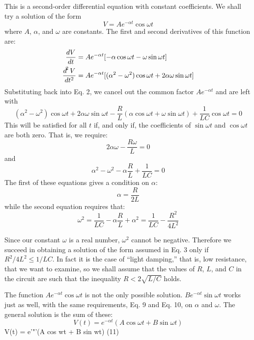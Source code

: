 This is a second-order differential equation with constant 
coefficients. We shall try a solution of the form
\begin{equation}
  V = A e^{-\alpha t}\cos\omega t
\end{equation}
where $A$, $\alpha$, and $\omega$ are constants. The first and second derivatives of
this function are:
\begin{align}
  \frac{\mathop{d\!} V}{\mathop{d\!} t} &=    A e^{-\alpha t}[-\alpha\cos\omega t-\omega\sin\omega t] \\
  \frac{\mathop{d\!}^2V}{\mathop{d\!} t^2} &= A e^{-\alpha t}[(\alpha^2-\omega^2)\cos\omega t+2\alpha\omega\sin\omega t]
\end{align}
Substituting back into Eq. 2, we cancel out the common factor $A e^{-\alpha t}$
and are left with
\begin{equation}
  (\alpha^2-\omega^2)\cos\omega t+2\alpha\omega\sin\omega t
       -\frac{R}{L}(\alpha\cos\omega t+\omega\sin\omega t)
       +\frac{1}{LC}\cos\omega t = 0
\end{equation}
This will be satisfied for all $t$ if, and only if, the coefficients of $\sin \omega t$
and $\cos\omega t$ are both zero. That is, we require:
\begin{equation}
  2\alpha\omega-\frac{R\omega}{L} = 0
\end{equation}
and
\begin{equation}
  \alpha^2-\omega^2-\alpha\frac{R}{L}+\frac{1}{LC} = 0
\end{equation}
The first of these equations gives a condition on $\alpha$:
\begin{equation}
  \alpha = \frac{R}{2L}
\end{equation}
while the second equation requires that:
\begin{equation}
  \omega^2 = \frac{1}{LC}-\alpha \frac{R}{L} + \alpha^2 = \frac{1}{LC}-\frac{R^2}{4L^2}
\end{equation}

Since our constant $\omega$ is a real number, $\omega^2$ cannot be negative.
Therefore we succeed in obtaining a solution of the form assumed in
Eq. 3 only if $R^2/4L^2\le 1/LC$. In fact it is the case of ``light
damping,'' that is, low resistance, that we want to examine, so we
shall assume that the values of $R$, $L$, and $C$ in the circuit are such that
the inequality $R < 2\sqrt{L/C}$ holds.

The function $A e^{-\alpha t}\cos\omega t$ is not the only possible solution.
$B e^{-\alpha t}\sin\omega t$ works just as well, with the same requirements, Eq. 9 and
Eq. 10, on $\alpha$ and $\omega$. The general solution is the sum of
these:
\begin{equation}
  V(t) = e^{-\alpha t}(A\cos\omega t+B\sin\omega t)
\end{equation}
V(t) = e'"'(A cos wt + B sin wt) (11)

